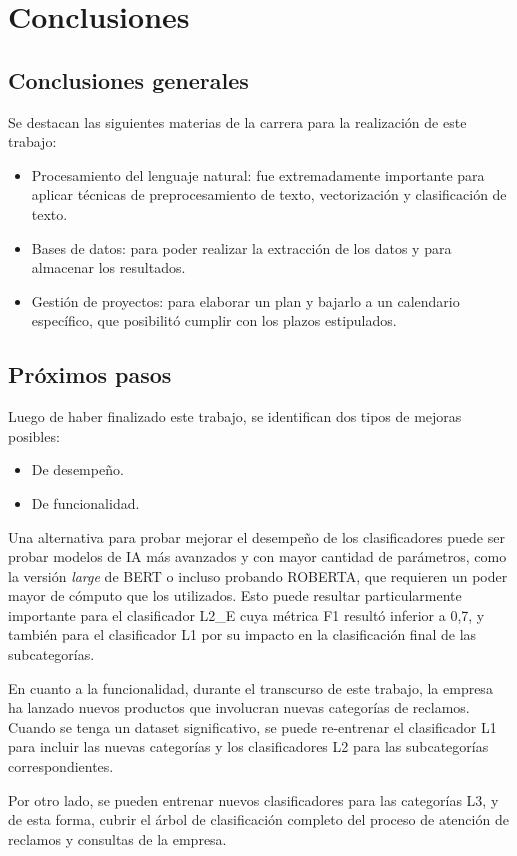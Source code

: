 
\chapter{Conclusiones} %

\label{Chapter5} %

\section{Conclusiones generales}


Se destacan las siguientes materias de la carrera para la realización de este trabajo:
\begin{itemize}
	\item Procesamiento del lenguaje natural: fue extremadamente importante para aplicar técnicas de preprocesamiento de texto, vectorización y clasificación de texto.
	\item Bases de datos: para poder realizar la extracción de los datos y para almacenar los resultados.
	\item Gestión de proyectos: para elaborar un plan y bajarlo a un calendario específico, que posibilitó cumplir con los plazos estipulados.
\end{itemize}


\section{Próximos pasos}

Luego de haber finalizado este trabajo, se identifican dos tipos de mejoras posibles: 
\begin{itemize}
	\item De desempeño.
	\item De funcionalidad.
\end{itemize}

Una alternativa para probar mejorar el desempeño de los clasificadores puede ser probar modelos de IA más avanzados y con mayor cantidad de parámetros, como la versión \textit{large} de BERT o incluso probando ROBERTA, que requieren un poder mayor de cómputo que los utilizados. Esto puede resultar particularmente importante para el clasificador L2\_E cuya métrica F1 resultó inferior a 0,7, y también para el clasificador L1 por su impacto en la clasificación final de las subcategorías.

En cuanto a la funcionalidad, durante el transcurso de este trabajo, la empresa ha lanzado nuevos productos que involucran nuevas categorías de reclamos. Cuando se tenga un dataset significativo, se puede re-entrenar el clasificador L1 para incluir las nuevas categorías y los clasificadores L2 para las subcategorías correspondientes.

Por otro lado, se pueden entrenar nuevos clasificadores para las categorías L3, y de esta forma, cubrir el árbol de clasificación completo del proceso de atención de reclamos y consultas de la empresa.
